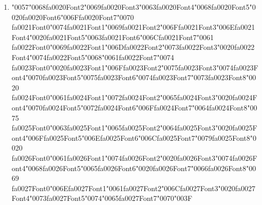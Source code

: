 \documentclass[12pt]{article}
\begin{document}
\begin{enumerate}[label=Q\arabic*.]
 \begin{enumerate}[label=(\Alph*)]
     \item Implicit regularization of weights
     \item Exponentially more expressive representations
     \item Increased ability to model hierarchical structure
     \item A model equivalent to a single linear transformation
 \end{enumerate}
 
 \item {\char"0057}{\char"0068}{\csname fa0020Font2\endcsname\char"0069}{\csname fa0020Font3\endcsname\char"0063}{\csname fa0020Font4\endcsname\char"0068}{\csname fa0020Font5\endcsname\char"0020}{\csname fa0020Font6\endcsname\char"006F}{\csname fa0020Font7\endcsname\char"0070} {\csname fa0021Font0\endcsname\char"0074}{\csname fa0021Font1\endcsname\char"0069}{\csname fa0021Font2\endcsname\char"006F}{\csname fa0021Font3\endcsname\char"006E}{\csname fa0021Font4\endcsname\char"0020}{\csname fa0021Font5\endcsname\char"0063}{\csname fa0021Font6\endcsname\char"006C}{\csname fa0021Font7\endcsname\char"0061} {\csname fa0022Font0\endcsname\char"0069}{\csname fa0022Font1\endcsname\char"006D}{\csname fa0022Font2\endcsname\char"0073}{\csname fa0022Font3\endcsname\char"0020}{\csname fa0022Font4\endcsname\char"0074}{\csname fa0022Font5\endcsname\char"0068}{\char"0061}{\csname fa0022Font7\endcsname\char"0074} {\csname fa0023Font0\endcsname\char"0020}{\csname fa0023Font1\endcsname\char"006F}{\csname fa0023Font2\endcsname\char"0075}{\csname fa0023Font3\endcsname\char"0074}{\csname fa0023Font4\endcsname\char"0070}{\csname fa0023Font5\endcsname\char"0075}{\csname fa0023Font6\endcsname\char"0074}{\csname fa0023Font7\endcsname\char"0073}{\csname fa0023Font8\endcsname\char"0020} {\csname fa0024Font0\endcsname\char"0061}{\csname fa0024Font1\endcsname\char"0072}{\csname fa0024Font2\endcsname\char"0065}{\csname fa0024Font3\endcsname\char"0020}{\csname fa0024Font4\endcsname\char"0070}{\csname fa0024Font5\endcsname\char"0072}{\csname fa0024Font6\endcsname\char"006F}{\csname fa0024Font7\endcsname\char"0064}{\csname fa0024Font8\endcsname\char"0075} {\csname fa0025Font0\endcsname\char"0063}{\csname fa0025Font1\endcsname\char"0065}{\csname fa0025Font2\endcsname\char"0064}{\csname fa0025Font3\endcsname\char"0020}{\csname fa0025Font4\endcsname\char"006F}{\csname fa0025Font5\endcsname\char"006E}{\csname fa0025Font6\endcsname\char"006C}{\csname fa0025Font7\endcsname\char"0079}{\csname fa0025Font8\endcsname\char"0020} {\csname fa0026Font0\endcsname\char"0061}{\csname fa0026Font1\endcsname\char"0074}{\csname fa0026Font2\endcsname\char"0020}{\csname fa0026Font3\endcsname\char"0074}{\csname fa0026Font4\endcsname\char"0068}{\csname fa0026Font5\endcsname\char"0065}{\csname fa0026Font6\endcsname\char"0020}{\csname fa0026Font7\endcsname\char"0066}{\csname fa0026Font8\endcsname\char"0069} {\csname fa0027Font0\endcsname\char"006E}{\csname fa0027Font1\endcsname\char"0061}{\csname fa0027Font2\endcsname\char"006C}{\csname fa0027Font3\endcsname\char"0020}{\csname fa0027Font4\endcsname\char"0073}{\csname fa0027Font5\endcsname\char"0074}{\char"0065}{\csname fa0027Font7\endcsname\char"0070}{\char"003F}

\end{enumerate}
\end{document}

